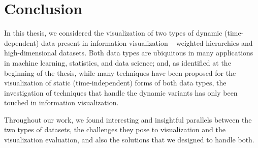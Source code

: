 \chapter{Conclusion}
\label{ch:conclusion}






In this thesis, we considered the visualization of two types of dynamic (time-dependent) data present in information visualization -- weighted hierarchies and high-dimensional datasets. Both data types are ubiquitous in many applications in machine learning, statistics, and data science; and, as identified at the beginning of the thesis, while many techniques have been proposed for the visualization of static (time-independent) forms of both data types, the investigation of techniques that handle the dynamic variants has only been touched in information visualization.

Throughout our work, we found interesting and insightful parallels between the two types of datasets, the challenges they pose to visualization and the visualization evaluation, and also the solutions that we designed to handle both.

